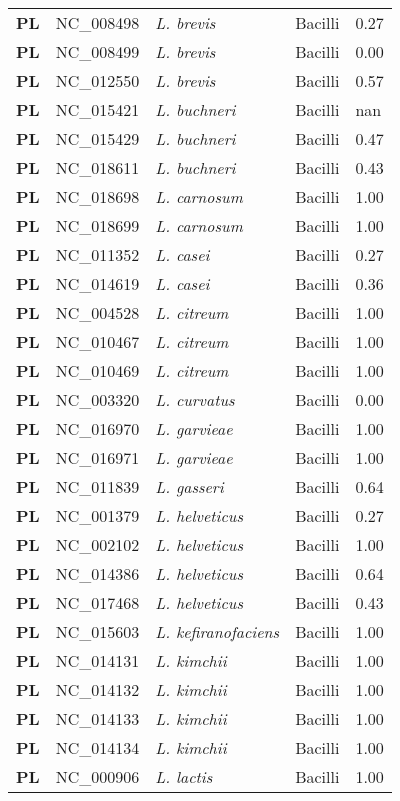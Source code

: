 \begin{adjustwidth}{-3cm}{2cm}
{\begin{supertabular}{>{\bfseries}l|p{0.1\textwidth}p{0.14\textwidth}l|l}
PL & NC\_008498 & \textit{L. brevis} & Bacilli & 0.27\\
PL & NC\_008499 & \textit{L. brevis} & Bacilli & 0.00\\
PL & NC\_012550 & \textit{L. brevis} & Bacilli & 0.57\\
PL & NC\_015421 & \textit{L. buchneri} & Bacilli & nan\\
PL & NC\_015429 & \textit{L. buchneri} & Bacilli & 0.47\\
PL & NC\_018611 & \textit{L. buchneri} & Bacilli & 0.43\\
PL & NC\_018698 & \textit{L. carnosum} & Bacilli & 1.00\\
PL & NC\_018699 & \textit{L. carnosum} & Bacilli & 1.00\\
PL & NC\_011352 & \textit{L. casei} & Bacilli & 0.27\\
PL & NC\_014619 & \textit{L. casei} & Bacilli & 0.36\\
PL & NC\_004528 & \textit{L. citreum} & Bacilli & 1.00\\
PL & NC\_010467 & \textit{L. citreum} & Bacilli & 1.00\\
PL & NC\_010469 & \textit{L. citreum} & Bacilli & 1.00\\
PL & NC\_003320 & \textit{L. curvatus} & Bacilli & 0.00\\
PL & NC\_016970 & \textit{L. garvieae} & Bacilli & 1.00\\
PL & NC\_016971 & \textit{L. garvieae} & Bacilli & 1.00\\
PL & NC\_011839 & \textit{L. gasseri} & Bacilli & 0.64\\
PL & NC\_001379 & \textit{L. helveticus} & Bacilli & 0.27\\
PL & NC\_002102 & \textit{L. helveticus} & Bacilli & 1.00\\
PL & NC\_014386 & \textit{L. helveticus} & Bacilli & 0.64\\
PL & NC\_017468 & \textit{L. helveticus} & Bacilli & 0.43\\
PL & NC\_015603 & \textit{L. kefiranofaciens} & Bacilli & 1.00\\
PL & NC\_014131 & \textit{L. kimchii} & Bacilli & 1.00\\
PL & NC\_014132 & \textit{L. kimchii} & Bacilli & 1.00\\
PL & NC\_014133 & \textit{L. kimchii} & Bacilli & 1.00\\
PL & NC\_014134 & \textit{L. kimchii} & Bacilli & 1.00\\
PL & NC\_000906 & \textit{L. lactis} & Bacilli & 1.00\\

\end{supertabular}}
\end{adjustwidth}
